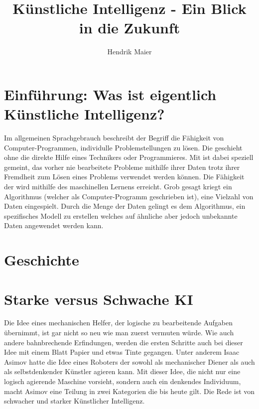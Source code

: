 \documentclass[12pt]{report}
\title{Künstliche Intelligenz - Ein Blick in die Zukunft}
\author{Hendrik Maier}
\date{}
\begin{document}
    \maketitle

    \tableofcontents
    \newpage

    \section{Einführung: Was ist eigentlich Künstliche Intelligenz?}
    Im allgemeinen Sprachgebrauch beschreibt der Begriff  die Fähigkeit von Computer-Programmen,
    individulle Problemstellungen zu lösen. Die geschieht ohne die direkte Hilfe eines Technikers oder Programmieres.
    Mit  ist dabei speziell gemeint, das vorher nie bearbeitete Probleme mithilfe ihrer Daten
    trotz ihrer Fremdheit zum Lösen eines Problems verwendet werden können. Die Fähigkeit der 
    wird mithilfe des maschinellen Lernens erreicht. Grob gesagt kriegt ein Algorithmus (welcher als Computer-Programm geschrieben ist),
    eine Vielzahl von Daten eingespielt. Durch die Menge der Daten gelingt es dem Algorithmus, ein spezifisches
    Modell zu erstellen welches auf ähnliche aber jedoch unbekannte Daten angewendet werden kann.
    
    \section{Geschichte}

    \section{Starke versus Schwache KI}
    Die Idee eines mechanischen Helfer, der logische zu bearbeitende Aufgaben übernimmt, ist gar nicht so neu wie man
    zuerst vermuten würde. Wie auch andere bahnbrechende Erfindungen, werden die ersten Schritte auch bei dieser Idee
    mit einem Blatt Papier und etwas Tinte gegangen. Unter anderem Isaac Asimov hatte die Idee
    eines Roboters der sowohl als mechanischer Diener als auch als selbstdenkender Künstler agieren kann.\cite{asimov2000der}
    Mit dieser Idee, die nicht nur eine logisch agierende Maschine vorsieht, sondern auch ein denkendes Individuum, macht Asimov
    eine Teilung in zwei Kategorien die bis heute gilt. Die Rede ist von schwacher und starker Künstlicher Intelligenz.\\
\end{document}

